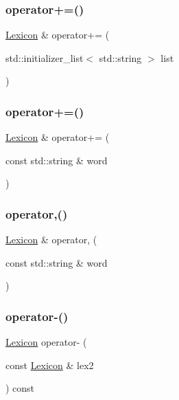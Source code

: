 \subsubsection{\texorpdfstring{operator+=()}{operator+=()}\hspace{0.1cm}{\footnotesize\ttfamily [2/3]}}
{\footnotesize\ttfamily \mbox{\hyperlink{classLexicon}{Lexicon}} \& operator+= (\begin{DoxyParamCaption}\item[{std\+::initializer\+\_\+list$<$ std\+::string $>$}]{list }\end{DoxyParamCaption})}

\mbox{\label{classLexicon_a051f30ebfa7b8fbb7ea1dc5af23d3004}} 
\subsubsection{\texorpdfstring{operator+=()}{operator+=()}\hspace{0.1cm}{\footnotesize\ttfamily [3/3]}}
{\footnotesize\ttfamily \mbox{\hyperlink{classLexicon}{Lexicon}} \& operator+= (\begin{DoxyParamCaption}\item[{const std\+::string \&}]{word }\end{DoxyParamCaption})}

\mbox{\label{classLexicon_a75f32eb2f65c3c3968193cfd72bdfd1a}} 
\subsubsection{\texorpdfstring{operator,()}{operator,()}}
{\footnotesize\ttfamily \mbox{\hyperlink{classLexicon}{Lexicon}} \& operator, (\begin{DoxyParamCaption}\item[{const std\+::string \&}]{word }\end{DoxyParamCaption})}

\mbox{\label{classLexicon_a487624601a6357e1b6d64053f9ebb5e2}} 
\subsubsection{\texorpdfstring{operator-\/()}{operator-()}\hspace{0.1cm}{\footnotesize\ttfamily [1/3]}}
{\footnotesize\ttfamily \mbox{\hyperlink{classLexicon}{Lexicon}} operator-\/ (\begin{DoxyParamCaption}\item[{const \mbox{\hyperlink{classLexicon}{Lexicon}} \&}]{lex2 }\end{DoxyParamCaption}) const}

